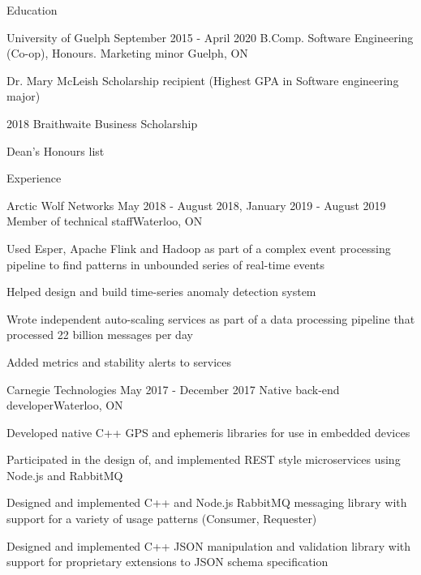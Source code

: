 \documentclass{resume}
\begin{document}
  \begin{rSection}{Education}
    \begin{rSubsection}{University of Guelph}
    	{September 2015 - April 2020}
    	{ B.Comp. Software Engineering (Co-op), Honours. Marketing minor }{Guelph, ON}
    	\item { Dr. Mary McLeish Scholarship recipient (Highest GPA in Software engineering major)} 
    	\item { 2018 Braithwaite Business Scholarship} 
    	\item { Dean's Honours list }
	\end{rSubsection}
  \end{rSection}

  \begin{rSection}{Experience}
    \begin{rSubsection}{Arctic Wolf Networks}
    	{May 2018 - August 2018, January 2019 - August 2019}
    	{Member of technical staff}{Waterloo, ON}
    	\item Used Esper, Apache Flink and Hadoop as part of a complex event processing pipeline 
    		to find patterns in unbounded series of real-time events
    	\item Helped design and build time-series anomaly detection system
    	\item Wrote independent auto-scaling services as part of a data processing pipeline that 
    		processed 22 billion messages per day
    	\item Added metrics and stability alerts to services
    \end{rSubsection}

    \begin{rSubsection}{Carnegie Technologies}
    	{May 2017 - December 2017}
    	{Native back-end developer}{Waterloo, ON}
    	\item Developed native C++ GPS and ephemeris libraries for use in embedded devices
    	\item Participated in the design of, and implemented REST style microservices using 
    		Node.js and RabbitMQ
    	\item Designed and implemented C++ and Node.js RabbitMQ messaging library with 
    		support for a variety of usage patterns (Consumer, Requester)
    	\item Designed and implemented C++ JSON manipulation and validation library with 
    		support for proprietary extensions to JSON schema specification
    \end{rSubsection}
  \end{rSection}
\end{document}
